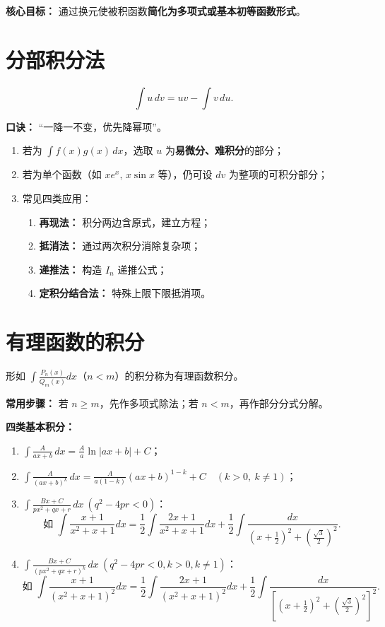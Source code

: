 \textbf{核心目标：} 通过换元使被积函数\textbf{简化为多项式或基本初等函数形式}。

\section{分部积分法}

\[
    \int u\,dv = uv - \int v\,du.
\]

\textbf{口诀：} “一降一不变，优先降幂项”。

\begin{enumerate}
    \item 若为 $\int f(x)g(x)\,dx$，选取 $u$ 为\textbf{易微分、难积分}的部分；
    \item 若为单个函数（如 $x e^x,\, x\sin x$ 等），仍可设 $dv$ 为整项的可积分部分；
    \item 常见四类应用：
          \begin{enumerate}
              \item \textbf{再现法：} 积分两边含原式，建立方程；
              \item \textbf{抵消法：} 通过两次积分消除复杂项；
              \item \textbf{递推法：} 构造 $I_n$ 递推公式；
              \item \textbf{定积分结合法：} 特殊上限下限抵消项。
          \end{enumerate}
\end{enumerate}

\section{有理函数的积分}

形如 $\displaystyle \int \frac{P_n(x)}{Q_m(x)}dx$（$n<m$）的积分称为有理函数积分。

\textbf{常用步骤：}
若 $n\ge m$，先作多项式除法；若 $n<m$，再作部分分式分解。

\textbf{四类基本积分：}
\begin{enumerate}
    \item $\displaystyle \int\frac{A}{ax+b}\,dx = \frac{A}{a}\ln|ax+b| + C$；
    \item $\displaystyle \int\frac{A}{(ax+b)^k}\,dx = \frac{A}{a(1-k)}(ax+b)^{1-k} + C \quad (k>0,\ k\ne1)$；
    \item $\displaystyle \int\frac{Bx+C}{px^2+qx+r}\,dx\ (q^2-4pr<0)$：
          \[
              \text{如 } \int\frac{x+1}{x^2+x+1}dx = \frac{1}{2}\int\frac{2x+1}{x^2+x+1}dx + \frac{1}{2}\int\frac{dx}{\left(x+\frac{1}{2}\right)^2+\left(\frac{\sqrt{3}}{2}\right)^2}.
          \]
    \item $\displaystyle \int\frac{Bx+C}{(px^2+qx+r)^k}\,dx\ (q^2-4pr<0,k>0,k\ne1)$：
          \[
              \text{如 } \int\frac{x+1}{(x^2+x+1)^2}dx = \frac{1}{2}\int\frac{2x+1}{(x^2+x+1)^2}dx + \frac{1}{2}\int\frac{dx}{\left[\left(x+\frac{1}{2}\right)^2+\left(\frac{\sqrt{3}}{2}\right)^2\right]^2}.
          \]
\end{enumerate}

